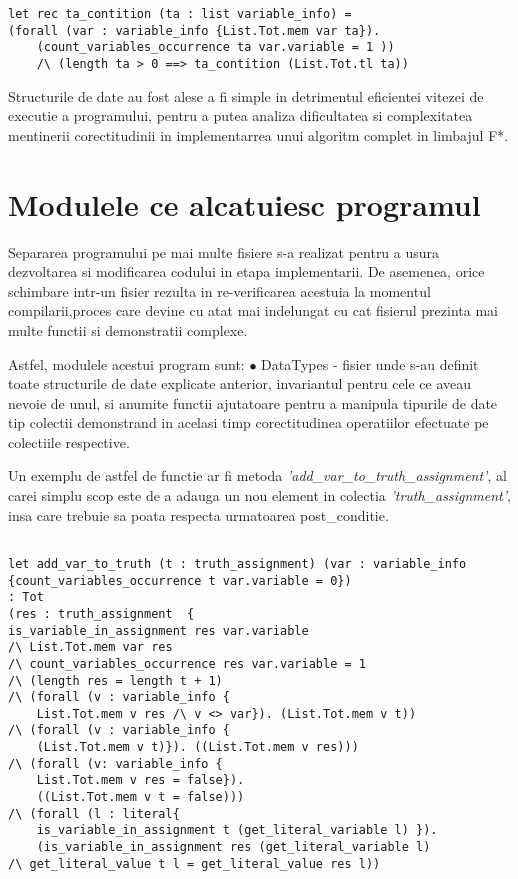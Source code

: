 \begin{lstlisting}[]
let rec ta_contition (ta : list variable_info) = 
(forall (var : variable_info {List.Tot.mem var ta}). 
	(count_variables_occurrence ta var.variable = 1 ))
	/\ (length ta > 0 ==> ta_contition (List.Tot.tl ta))

\end{lstlisting}

Structurile de date au fost alese a fi simple in detrimentul eficientei vitezei de executie a programului, pentru a putea analiza dificultatea si complexitatea mentinerii corectitudinii in implementarrea unui algoritm complet in limbajul F*. 



\section{Modulele ce alcatuiesc programul}

Separarea programului pe mai multe fisiere s-a realizat pentru a usura \newline dezvoltarea si modificarea codului in etapa implementarii. De asemenea, orice \newline schimbare intr-un fisier rezulta in re-verificarea acestuia la momentul compilarii,\newline proces care devine cu atat mai indelungat cu cat fisierul prezinta mai multe functii si demonstratii complexe.

Astfel, modulele acestui program sunt: \newline
$\bullet$ DataTypes - fisier unde s-au definit toate structurile de date explicate anterior, \newline invariantul pentru cele ce aveau nevoie de unul, si anumite functii ajutatoare pentru a manipula tipurile de date tip colectii demonstrand in acelasi timp corectitudinea \newline operatiilor efectuate pe colectiile respective. 

Un exemplu de astfel de functie ar fi metoda
\textit{'add\_var\_to\_truth\_assignment'}, al carei simplu scop este de a adauga un nou element in colectia \textit{'truth\_assignment'}, insa care trebuie sa poata respecta urmatoarea post\_conditie.

\begin{lstlisting}[]

let add_var_to_truth (t : truth_assignment) (var : variable_info {count_variables_occurrence t var.variable = 0}) 
: Tot 
(res : truth_assignment  {
is_variable_in_assignment res var.variable
/\ List.Tot.mem var res
/\ count_variables_occurrence res var.variable = 1
/\ (length res = length t + 1) 
/\ (forall (v : variable_info {
	List.Tot.mem v res /\ v <> var}). (List.Tot.mem v t))
/\ (forall (v : variable_info {
	(List.Tot.mem v t)}). ((List.Tot.mem v res)))
/\ (forall (v: variable_info {
	List.Tot.mem v res = false}). 
	((List.Tot.mem v t = false)))
/\ (forall (l : literal{ 
	is_variable_in_assignment t (get_literal_variable l) }). 
	(is_variable_in_assignment res (get_literal_variable l)
/\ get_literal_value t l = get_literal_value res l))  

\end{lstlisting}

